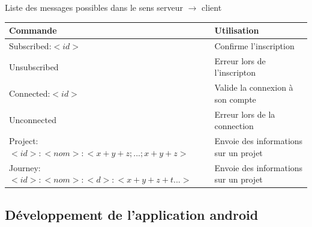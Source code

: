     \begin{center}
        Liste des messages possibles dans le sens serveur $\rightarrow$ client
        \par
        \begin{tabular}{|l|l|}
            \hline
            Commande & Utilisation\\
            \hline
            Subscribed:$<id>$ & Confirme l'inscription \\
            \hline
            Unsubscribed & Erreur lors de l'inscripton \\
            \hline
            Connected:$<id>$ & Valide la connexion à son compte\\
            \hline
            Unconnected & Erreur lors de la connection \\
            \hline
            \hline
            Project:$<id>:<nom>:<x+y+z;...;x+y+z>$ & Envoie des informations sur un projet\\
            \hline
            Journey:$<id>:<nom>:<d>:<x+y+z+t...>$ & Envoie des informations sur un projet\\
            \hline
        \end{tabular}
    \end{center}


\subsection{Développement de l'application android}
